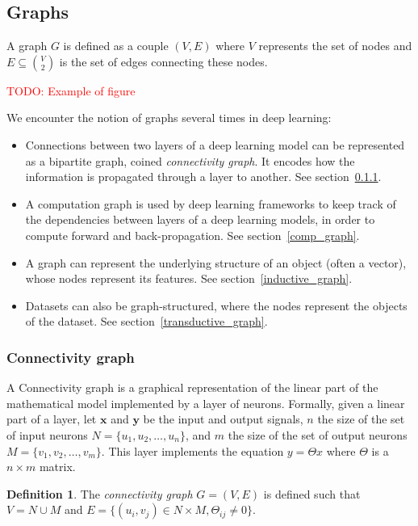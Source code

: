 \documentclass{article}
\theoremstyle{definition}
\newtheorem{definition}{Definition}[section]
\newcommand{\todo}[1]{\textcolor{red}{TODO: #1}}
\begin{document}
\subsection{Graphs}

A graph $G$ is defined as a couple $(V,E)$ where $V$ represents the set of nodes and $E \subseteq\binom{V}{2}$ is the set of edges connecting these nodes.

\todo{Example of figure}

We encounter the notion of graphs several times in deep learning:
\begin{itemize}
\item Connections between two layers of a deep learning model can be represented as a bipartite graph, coined \emph{connectivity graph}. It encodes how the information is propagated through a layer to another. See section~\ref{con_graph}.
\item A computation graph is used by deep learning frameworks to keep track of the dependencies between layers of a deep learning models, in order to compute forward and back-propagation. See section~\ref{comp_graph}.
\item A graph can represent the underlying structure of an object (often a vector), whose nodes represent its features. See section~\ref{inductive_graph}.
\item Datasets can also be graph-structured, where the nodes represent the objects of the dataset. See section~\ref{transductive_graph}.
\end{itemize}

\subsubsection{Connectivity graph}
\label{con_graph}

A Connectivity graph is a graphical representation of the linear part of the mathematical model implemented by a layer of neurons.
Formally, given a linear part of a layer, let $\textbf{x}$ and $\textbf{y}$ be the input and output signals, $n$ the size of the set of input neurons $N = \{u_1, u_2, \ldots, u_n\}$, and $m$ the size of the set of output neurons $M = \{v_1, v_2, \ldots, v_m\}$. This layer implements the equation $y = \Theta x$ where $\Theta$ is a $n \times m$ matrix.

\begin{definition}
{The \emph{connectivity graph} $G = (V,E)$ is defined such that $V = N \cup M$ and $E = \{(u_i,v_j) \in  N \times M, \Theta_{ij} \neq 0 \} $.}
\end{definition}
\end{document}
